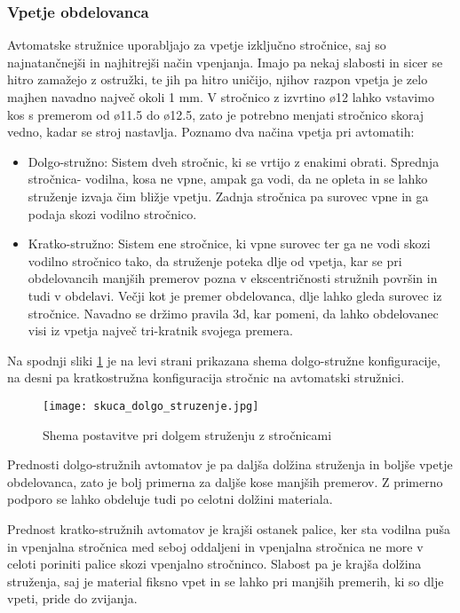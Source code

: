\subsubsection{Vpetje obdelovanca}
Avtomatske stružnice uporabljajo za vpetje izključno stročnice,
saj so najnatančnejši in najhitrejši način vpenjanja. Imajo pa nekaj slabosti
in sicer se hitro zamažejo z ostružki, te jih pa hitro uničijo,
njihov razpon vpetja je zelo majhen navadno največ okoli 1 mm. V stročnico z
izvrtino ø12 lahko vstavimo kos s premerom od ø11.5 do ø12.5,
zato je potrebno menjati stročnico skoraj vedno, kadar se stroj nastavlja.
Poznamo dva načina vpetja pri avtomatih:
\begin{itemize}
	\item Dolgo-stružno: Sistem dveh stročnic, ki se vrtijo z
	      enakimi obrati. Sprednja stročnica- vodilna, kosa ne vpne,
	      ampak ga vodi, da ne opleta in se lahko struženje izvaja čim
	      bližje vpetju. Zadnja stročnica pa surovec vpne in ga podaja
	      skozi vodilno stročnico.
	\item Kratko-stružno: Sistem ene stročnice, ki vpne surovec
	      ter ga ne vodi skozi vodilno stročnico tako, da struženje
	      poteka dlje od vpetja, kar se pri obdelovancih manjših
	      premerov pozna v ekscentričnosti stružnih površin in tudi v obdelavi.
	      Večji kot je premer obdelovanca, dlje lahko gleda surovec iz stročnice.
	      Navadno se držimo pravila 3d, kar pomeni, da lahko obdelovanec visi
	      iz vpetja največ tri-kratnik svojega premera.
\end{itemize}

Na spodnji sliki \ref{tipi_vodilnih_pus} je na levi strani prikazana
shema dolgo-stružne konfiguracije, na desni pa kratkostružna konfiguracija
stročnic na avtomatski stružnici.

\begin{figure}
	\begin{center}
		\texttt{[image: skuca\_dolgo\_struzenje.jpg]}
		\caption{Shema postavitve pri dolgem struženju z stročnicami
			\cite{interna}}
		\label{tipi_vodilnih_pus}
	\end{center}
\end{figure}

Prednosti dolgo-stružnih avtomatov je pa daljša dolžina struženja
in boljše vpetje obdelovanca, zato je bolj primerna za daljše
kose manjših premerov. Z primerno podporo se lahko obdeluje
tudi po celotni dolžini materiala.

Prednost kratko-stružnih avtomatov je krajši ostanek palice,
ker sta vodilna puša in vpenjalna stročnica med seboj oddaljeni
in vpenjalna stročnica ne more v celoti poriniti palice skozi vpenjalno
stročninco. Slabost pa je krajša dolžina struženja, saj je material
fiksno vpet in se lahko pri manjših premerih, ki so dlje vpeti, pride
do zvijanja.

